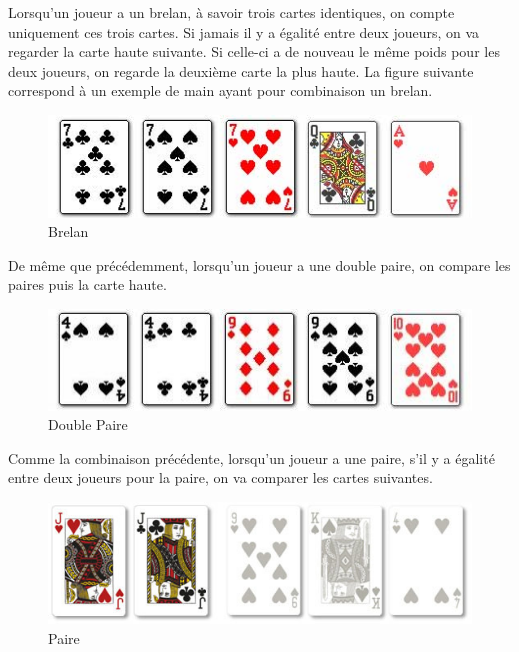 \documentclass{report}
\begin{document}
Lorsqu'un joueur a un brelan, à savoir trois cartes identiques, on compte uniquement ces trois cartes. Si jamais il y a égalité entre deux joueurs, on va regarder la carte haute suivante. Si celle-ci a de nouveau le même poids pour les deux joueurs, on regarde la deuxième carte la plus haute. La figure suivante correspond à un exemple de main ayant pour combinaison un brelan.\par
		\begin{figure}[H]
			\begin{center}
				\includegraphics[scale=0.4]{./imagesRapport/brelan.jpg}
			\end{center}
			\caption[Brelan]{Brelan}
		\end{figure}
		\medskip
De même que précédemment, lorsqu'un joueur a une double paire, on compare les paires puis la carte haute. 
		\begin{figure}[H]
			\begin{center}
				\includegraphics[scale=0.3]{./imagesRapport/doublePaire.jpg}
			\end{center}
			\caption[Double Paire]{Double Paire}
		\end{figure}
		\medskip

Comme la combinaison précédente, lorsqu'un joueur a une paire, s'il y a égalité entre deux joueurs pour la paire, on va comparer les cartes suivantes. \par
\newpage
		\begin{figure}[h]
			\begin{center}
				\includegraphics[scale=0.3]{./imagesRapport/paire.jpg}
			\end{center}
			\caption[Paire]{Paire}
		\end{figure}
		\medskip
\end{document}
